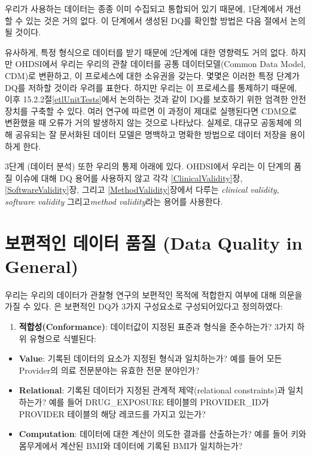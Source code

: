 \documentclass[11pt]{book}
\providecommand{\tightlist}{%
  \setlength{\itemsep}{0pt}\setlength{\parskip}{0pt}}
\theoremstyle{definition}
\theoremstyle{definition}
\theoremstyle{definition}
\theoremstyle{remark}
\begin{document}
우리가 사용하는 데이터는 종종 이미 수집되고 통합되어 있기 때문에,
1단계에서 개선할 수 있는 것은 거의 없다. 이 단계에서 생성된 DQ를 확인할
방법은 다음 절에서 논의될 것이다.

유사하게, 특정 형식으로 데이터를 받기 때문에 2단계에 대한 영향력도 거의
없다. 하지만 OHDSI에서 우리는 우리의 관찰 데이터를 공통
데이터모델(Common Data Model, CDM)로 변환하고, 이 프로세스에 대한
소유권을 갖는다. 몇몇은 이러한 특정 단계가 DQ를 저하할 것이라 우려를
표한다. 하지만 우리는 이 프로세스를 통제하기 때문에, 이후
15.2.2절\ref{etlUnitTests}에서 논의하는 것과 같이 DQ를 보호하기 위한
엄격한 안전장치를 구축할 수 있다. 여러
연구\citep{defalco_2013, makadia_2014, matcho_2014, voss_2015, voss_2015b, hripcsak_2018}에
따르면 이 과정이 제대로 실행된다면 CDM으로 변환했을 때 오류가 거의
발생하지 않는 것으로 나타났다. 실제로, 대규모 공동체에 의해 공유되는 잘
문서화된 데이터 모델은 명백하고 명확한 방법으로 데이터 저장을 용이하게
한다.

3단계 (데이터 분석) 또한 우리의 통제 아래에 있다. OHDSI에서 우리는 이
단계의 품질 이슈에 대해 DQ 용어를 사용하지 않고 각각
\ref{ClinicalValidity}장, \ref{SoftwareValidity}장, 그리고
\ref{MethodValidity}장에서 다루는 \emph{clinical validity},
\emph{software validity} 그리고\emph{method validity}라는 용어를
사용한다.

\section{보편적인 데이터 품질 (Data Quality in
General)}\label{---data-quality-in-general}

우리는 우리의 데이터가 관찰형 연구의 보편적인 목적에 적합한지 여부에
대해 의문을 가질 수 있다. \citet{kahn_harmonized_2016} 은 보편적인 DQ가
3가지 구성요소로 구성되어있다고 정의하였다:

\begin{enumerate}
\def\labelenumi{\arabic{enumi}.}
\tightlist
\item
  \textbf{적합성(Conformance)}: 데이터값이 지정된 표준과 형식을
  준수하는가? 3가지 하위 유형으로 식별된다:
\end{enumerate}

\begin{itemize}
\tightlist
\item
  \textbf{Value}: 기록된 데이터의 요소가 지정된 형식과 일치하는가? 예를
  들어 모든 Provider의 의료 전문분야는 유효한 전문 분야인가?
\item
  \textbf{Relational}: 기록된 데이터가 지정된 관계적 제약(relational
  constraints)과 일치하는가? 예를 들어 DRUG\_EXPOSURE 테이블의
  PROVIDER\_ID가 PROVIDER 테이블의 해당 레코드를 가지고 있는가?
\item
  \textbf{Computation}: 데이터에 대한 계산이 의도한 결과를 산출하는가?
  예를 들어 키와 몸무게에서 계산된 BMI와 데이터에 기록된 BMI가
  일치하는가?
\end{itemize}
\end{document}
